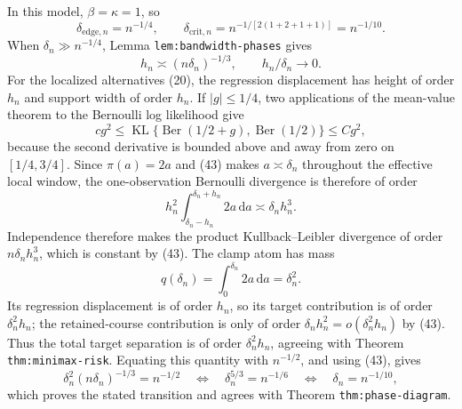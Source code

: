 In this model, \(\beta=\kappa=1\), so
\[
 \delta_{\mathrm{edge},n}=n^{-1/4},
 \qquad
 \delta_{\mathrm{crit},n}
 =n^{-1/[2(1+2+1+1)]}=n^{-1/10}. \tag{42}
\]
When \(\delta_n\gg n^{-1/4}\), Lemma \texttt{lem:bandwidth-phases} gives
\[
 h_n\asymp(n\delta_n)^{-1/3},
 \qquad h_n/\delta_n\to0. \tag{43}
\]
For the localized alternatives (20), the regression displacement has height of order \(h_n\) and support width of order \(h_n\).  If \(|g|\leq1/4\), two applications of the mean-value theorem to the Bernoulli log likelihood give
\[
 c g^2\leq
 \operatorname{KL}\{\operatorname{Ber}(1/2+g),\operatorname{Ber}(1/2)\}
 \leq Cg^2,
\]
because the second derivative is bounded above and away from zero on \([1/4,3/4]\).  Since \(\pi(a)=2a\) and (43) makes \(a\asymp\delta_n\) throughout the effective local window, the one-observation Bernoulli divergence is therefore of order
\[
 h_n^2\int_{\delta_n-h_n}^{\delta_n+h_n}2a\,\mathrm da
 \asymp\delta_nh_n^3.
\]
Independence therefore makes the product Kullback--Leibler divergence of order \(n\delta_nh_n^3\), which is constant by (43).  The clamp atom has mass
\[
 q(\delta_n)=\int_0^{\delta_n}2a\,\mathrm da=\delta_n^2.
\]
Its regression displacement is of order \(h_n\), so its target contribution is of order \(\delta_n^2h_n\); the retained-course contribution is only of order \(\delta_nh_n^2=o(\delta_n^2h_n)\) by (43).  Thus the total target separation is of order \(\delta_n^2h_n\), agreeing with Theorem \texttt{thm:minimax-risk}.  Equating this quantity with \(n^{-1/2}\), and using (43), gives
\[
 \delta_n^2(n\delta_n)^{-1/3}=n^{-1/2}
 \quad\Longleftrightarrow\quad
 \delta_n^{5/3}=n^{-1/6}
 \quad\Longleftrightarrow\quad
 \delta_n=n^{-1/10},
\]
which proves the stated transition and agrees with Theorem \texttt{thm:phase-diagram}.